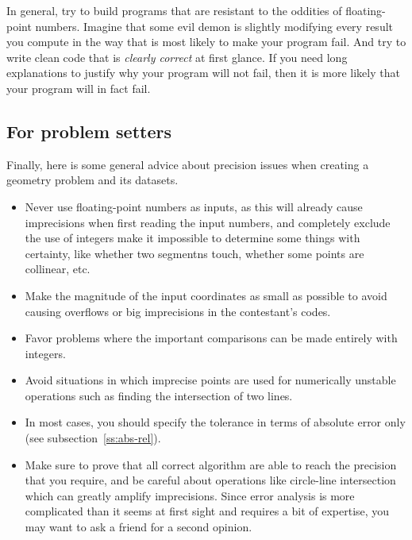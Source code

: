 In general, try to build programs that are resistant to the oddities of floating-point numbers. Imagine that some evil demon is slightly modifying every result you compute in the way that is most likely to make your program fail. And try to write clean code that is \emph{clearly correct} at first glance. If you need long explanations to justify why your program will not fail, then it is more likely that your program will in fact fail.

\subsection{For problem setters}
Finally, here is some general advice about precision issues when creating a geometry problem and its datasets.
\begin{itemize}
\item Never use floating-point numbers as inputs, as this will already cause imprecisions when first reading the input numbers, and completely exclude the use of integers make it impossible to determine some things with certainty, like whether two segmentns touch, whether some points are collinear, etc.
\item Make the magnitude of the input coordinates as small as possible to avoid causing overflows or big imprecisions in the contestant's codes.
\item Favor problems where the important comparisons can be made entirely with integers.
\item Avoid situations in which imprecise points are used for numerically unstable operations such as finding the intersection of two lines.
\item In most cases, you should specify the tolerance in terms of absolute error only (see subsection~\ref{ss:abs-rel}).
\item Make sure to prove that all correct algorithm are able to reach the precision that you require, and be careful about operations like circle-line intersection which can greatly amplify imprecisions. Since error analysis is more complicated than it seems at first sight and requires a bit of expertise, you may want to ask a friend for a second opinion.
\end{itemize}
